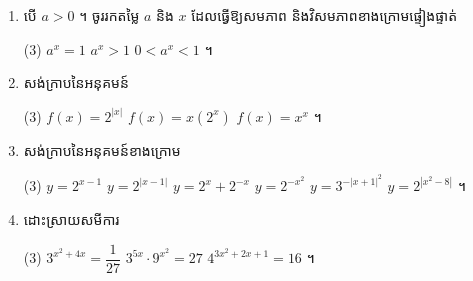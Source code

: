 \begin{enumerate}[1]
\begin{enumerate}[a]
    \begin{tasks}(2)
      \task $y = f(x) - 1$
      \task $y = f(x - 1)$
      \task $y = f(x + 1)$
      \task $y = f(0.5x)$
      \task $y = f(2x)$
      \task $y = f(-x)$ ។
    \end{tasks}
  \end{enumerate}
  \item បើ $a > 0$ ។ ចូររកតម្លៃ $a$ និង $x$ ដែលធ្វើឱ្យសមភាព និងវិសមភាពខាងក្រោមផ្ទៀងផ្ទាត់
  \begin{tasks}(3)
    \task $a^x = 1$
    \task $a^x > 1$
    \task $0 < a^x < 1$ ។
  \end{tasks}
  \item សង់ក្រាបនៃអនុគមន៍
  \begin{tasks}(3)
    \task $f(x) = 2^{|x|}$
    \task $f(x) = x(2^x)$
    \task $f(x) = x^x$ ។
  \end{tasks}
  \item សង់ក្រាបនៃអនុគមន៍ខាងក្រោម
  \begin{tasks}(3)
    \task $y = 2^{x-1}$
    \task $y = 2^{|x-1|}$
    \task $y = 2^x + 2^{-x}$
    \task $y = 2^{-x^2}$
    \task $y = 3^{-|x+1|^2}$
    \task $y = 2^{|x^2-8|}$ ។
  \end{tasks}
  \item ដោះស្រាយសមីការ
  \begin{tasks}(3)
    \task $3^{x^2+4x} = \dfrac{1}{27}$
    \task $3^{5x} \cdot 9^{x^2} = 27$
    \task $4^{3x^2+2x+1} = 16$ ។
  \end{tasks}
\end{enumerate}
